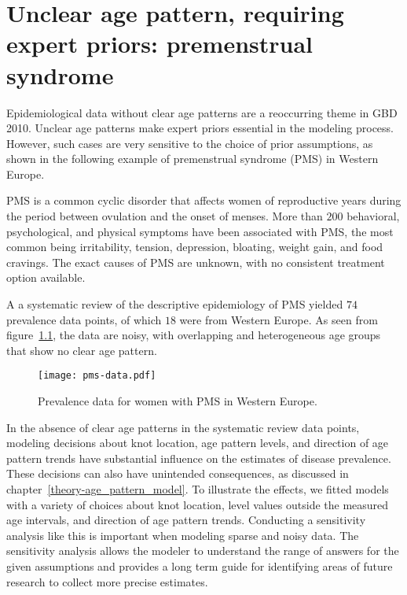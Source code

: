 \chapter{Unclear age pattern, requiring expert priors: premenstrual syndrome}
\label{applications-priors_knots_select}

Epidemiological data without clear age patterns are a reoccurring
theme in GBD 2010.  Unclear age patterns make expert priors
essential in the modeling process.  However, such cases are very
sensitive to the choice of prior assumptions, as shown in the
following example of premenstrual syndrome (PMS) in Western Europe.

PMS is a common cyclic disorder that affects women of reproductive
years during the period between ovulation and the onset of menses.
More than $200$ behavioral, psychological, and physical symptoms have been
associated with PMS, the most common being irritability, tension,
depression, bloating, weight gain, and food cravings.  The exact causes
of PMS are unknown, with no consistent
treatment option available. \cite{dickerson_premenstrual_2003, singh_incidence_1998,
  goodale_alleviation_1990}

A a systematic review of the descriptive
epidemiology of PMS yielded $74$ prevalence
data points, of which $18$ were from Western Europe.\cite{vos_global_2012}
  As seen from
figure~\ref{fig:app-pms_data}, the data are noisy, with overlapping and
heterogeneous age groups that show no clear age pattern.

    \begin{figure}[h]
        \begin{center}
            \texttt{[image: pms-data.pdf]}
        \end{center}
        \caption[Systematic review data for premenstrual syndrome.]{Prevalence
          data for women with PMS in Western Europe.}
        \label{fig:app-pms_data}
    \end{figure}


In the absence of clear age patterns in the systematic review data
points, modeling decisions about knot location, age pattern levels, and
direction of age pattern trends have substantial influence on the estimates of
disease prevalence.  These decisions can also have unintended
consequences, as discussed in chapter~\ref{theory-age_pattern_model}.
To illustrate the effects, we fitted models with a variety of choices
about knot location, level values outside the measured age
intervals, and direction of age pattern trends.  Conducting a sensitivity analysis
like this is important when modeling sparse and noisy data.  The sensitivity analysis allows
the modeler to understand the range of answers for the given assumptions
and provides a long term guide for identifying areas of future research
to collect more precise estimates.

